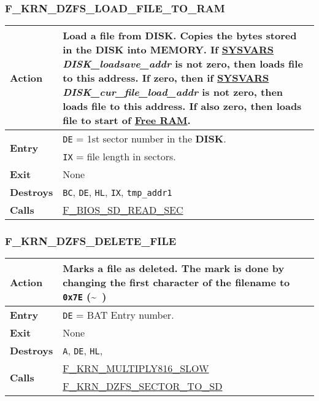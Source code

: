     \subsubsection{F\_KRN\_DZFS\_LOAD\_FILE\_TO\_RAM}
    \label{func:fkrndzfsloadfiletoram}
    \begin{tabular}{l p{9cm}}
        \hline\textbf{Action}
        & Load a file from \textbf{DISK}. Copies the bytes stored in the
        \textbf{DISK} into \textbf{MEMORY}. If \hyperref[sec:ram_memmap]{SYSVARS}
        \textit{DISK\_loadsave\_addr} is not zero, then loads file to this
        address. If zero, then if \hyperref[sec:ram_memmap]{SYSVARS}
        \textit{DISK\_cur\_file\_load\_addr} is not zero, then loads file to
        this address. If also zero, then loads file to start of
        \hyperref[subsec:memmap:ram]{Free RAM}.\\
        \hline\multirow[t]{2}{4em}{\textbf{Entry}}
        & \texttt{DE} = 1st sector number in the \textbf{DISK}.\\
        & \texttt{IX} = file length in sectors.\\
        \hline\textbf{Exit} & None\\
        \hline\textbf{Destroys} & \texttt{BC}, \texttt{DE}, \texttt{HL},
        \texttt{IX}, \texttt{tmp\_addr1}\\
        \hline\textbf{Calls}
        & \hyperref[func:fbiosdiskreadsec]{F\_BIOS\_SD\_READ\_SEC}\\
        \hline
    \end{tabular}

    \subsubsection{F\_KRN\_DZFS\_DELETE\_FILE}
    \label{func:fkrndzfsdeletefile}
    \begin{tabular}{l p{9cm}}
        \hline\textbf{Action}
        & Marks a file as deleted. The mark is done by changing the first
        character of the filename to \texttt{0x7E} (\textasciitilde~)\\
        \hline\textbf{Entry}
        & \texttt{DE} = BAT Entry number.\\
        \hline\textbf{Exit} & None\\
        \hline\textbf{Destroys} & \texttt{A}, \texttt{DE}, \texttt{HL},\\
        \hline\multirow[t]{2}{4em}{\textbf{Calls}}
        & \hyperref[func:fkrnmultiply816slow]{F\_KRN\_MULTIPLY816\_SLOW}\\
        & \hyperref[func:fkrndzfssectortodisk]{F\_KRN\_DZFS\_SECTOR\_TO\_SD}\\
        \hline
    \end{tabular}

